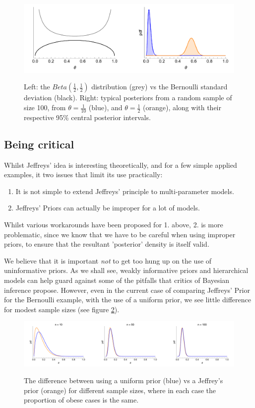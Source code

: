 \documentclass[11pt,fullpage]{book}
\begin{document}
\begin{figure}
\centering
\scalebox{0.5} 
{\includegraphics{Objective_jeffreysBeta.pdf}}
\caption{Left: the $Beta\left(\frac{1}{2},\frac{1}{2}\right)$ distribution (grey) vs the Bernoulli standard deviation (black). Right: typical posteriors from a random sample of size 100, from $\theta=\frac{1}{10}$ (blue), and $\theta=\frac{1}{2}$ (orange), along with their respective 95\% central posterior intervals.}\label{fig:Objective_jeffreysBeta}
\end{figure}


\subsection{Being critical}
Whilst Jeffreys' idea is interesting theoretically, and for a few simple applied examples, it two issues that limit its use practically:

\begin{enumerate}
\item It is not simple to extend Jeffreys' principle to multi-parameter models.
\item Jeffreys' Priors can actually be improper for a lot of models.
\end{enumerate}

Whilst various workarounds have been proposed for 1. above, 2. is more problematic, since we know that we have to be careful when using improper priors, to ensure that the resultant 'posterior' density is itself valid.

We believe that it is important \textit{not} to get too hung up on the use of uninformative priors. As we shall see, weakly informative priors and hierarchical models can help guard against some of the pitfalls that critics of Bayesian inference propose. However, even in the current case of comparing Jeffreys' Prior for the Bernoulli example, with the use of a uniform prior, we see little difference for modest sample sizes (see figure \ref{fig:Objective_jeffreysPrior}).

\begin{figure}
\centering
\scalebox{0.3} 
{\includegraphics{Objective_jeffreysPrior.pdf}}
\caption{The difference between using a uniform prior (blue) vs a Jeffrey's prior (orange) for different sample sizes, where in each case the proportion of obese cases is the same.}\label{fig:Objective_jeffreysPrior}
\end{figure}
\end{document}
